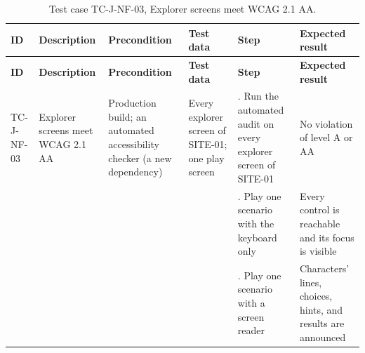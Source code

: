 {\footnotesize{}\renewcommand{\arraystretch}{1.1}
\begin{longtable}{|>{\raggedright\arraybackslash}p{}|>{\raggedright\arraybackslash}p{}|>{\raggedright\arraybackslash}p{}|>{\raggedright\arraybackslash}p{}|>{\raggedright\arraybackslash}p{}|>{\raggedright\arraybackslash}p{}|}
\caption{Test case TC-J-NF-03, Explorer screens meet WCAG 2.1 AA.} \\
\hline
\textbf{ID} & \textbf{Description} & \textbf{Precondition} & \textbf{Test data} & \textbf{Step} & \textbf{Expected result} \\ \hline
\endfirsthead
\hline
\textbf{ID} & \textbf{Description} & \textbf{Precondition} & \textbf{Test data} & \textbf{Step} & \textbf{Expected result} \\ \hline
\endhead
TC-J-NF-03 & Explorer screens meet WCAG 2.1 AA & Production build; an automated accessibility checker (a new dependency) & Every explorer screen of SITE-01; one play screen & 1. Run the automated audit on every explorer screen of SITE-01 & No violation of level A or AA \\ \cline{5-6}
 &  &  &  & 2. Play one scenario with the keyboard only & Every control is reachable and its focus is visible \\ \cline{5-6}
 &  &  &  & 3. Play one scenario with a screen reader & Characters' lines, choices, hints, and results are announced \\ \hline
\end{longtable}
}

